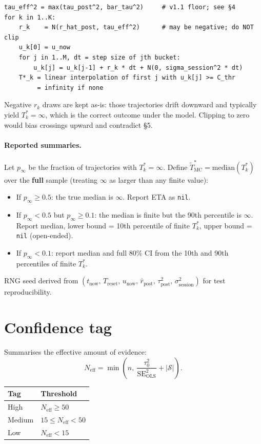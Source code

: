\documentclass[11pt]{article}
\newcommand{\rpost}{\hat r_{\text{post}}}
\newcommand{\taupostsq}{\tau_{\text{post}}^2}
\newcommand{\tauzerosq}{\tau_0^2}
\newcommand{\seolssq}{\mathrm{SE}_{\text{OLS}}^2}
\newcommand{\sigsessionsq}{\sigma_{\text{session}}^2}
\newcommand{\unow}{u_{\text{now}}}
\newcommand{\tnow}{t_{\text{now}}}
\newcommand{\Treset}{T_{\text{reset}}}
\newcommand{\Tstar}{T^\ast}
\newcommand{\Tstark}{T^\ast_k}
\begin{document}
\begin{lstlisting}
tau_eff^2 = max(tau_post^2, bar_tau^2)     # v1.1 floor; see §4
for k in 1..K:
    r_k    = N(r_hat_post, tau_eff^2)      # may be negative; do NOT clip
    u_k[0] = u_now
    for j in 1..M, dt = step size of jth bucket:
        u_k[j] = u_k[j-1] + r_k * dt + N(0, sigma_session^2 * dt)
    T*_k = linear interpolation of first j with u_k[j] >= C_thr
         = infinity if none
\end{lstlisting}

Negative $r_k$ draws are kept as-is: those trajectories drift downward and
typically yield $\Tstark = \infty$, which is the correct outcome under the
model. Clipping to zero would bias crossings upward and contradict \S5.

\paragraph{Reported summaries.} Let $p_\infty$ be the fraction of
trajectories with $\Tstark = \infty$. Define $\tilde\Tstar_{\text{MC}} =
\mathrm{median}(\Tstark)$ over the \textbf{full} sample (treating $\infty$
as larger than any finite value):

\begin{itemize}
  \item If $p_\infty \geq 0.5$: the true median is $\infty$. Report ETA as
    \texttt{nil}.
  \item If $p_\infty < 0.5$ but $p_\infty \geq 0.1$: the median is finite
    but the 90th percentile is $\infty$. Report median, lower bound = 10th
    percentile of finite $\Tstark$, upper bound = \texttt{nil}
    (open-ended).
  \item If $p_\infty < 0.1$: report median and full 80\% CI from the 10th
    and 90th percentiles of finite $\Tstark$.
\end{itemize}

RNG seed derived from $(\tnow,\, \Treset,\, \unow,\, \rpost,\, \taupostsq,\,
\sigsessionsq)$ for test reproducibility.

\section{Confidence tag}

Summarises the effective amount of evidence:
\[
  N_{\text{eff}} = \min\!\left(n,\
    \frac{\tauzerosq}{\seolssq} + \lvert\mathcal{S}\rvert\right).
\]

\begin{center}
\begin{tabular}{@{}ll@{}}
\toprule
Tag & Threshold \\
\midrule
High   & $N_{\text{eff}} \geq 50$ \\
Medium & $15 \leq N_{\text{eff}} < 50$ \\
Low    & $N_{\text{eff}} < 15$ \\
\bottomrule
\end{tabular}
\end{center}
\end{document}
